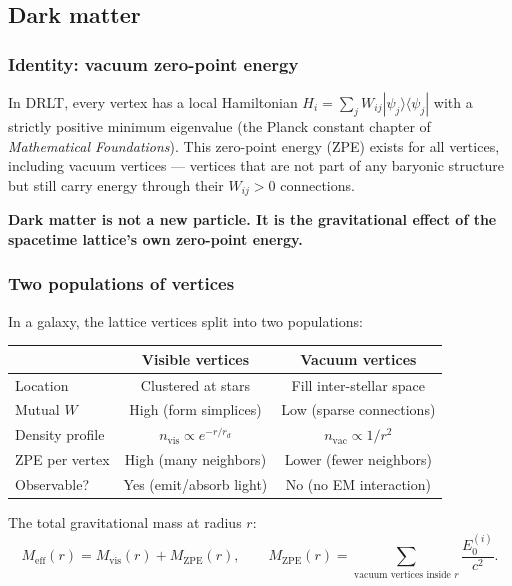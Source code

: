 \documentclass[12pt]{article}
\theoremstyle{remark}
\theoremstyle{definition}
\begin{document}
\subsection{Dark matter}

\subsubsection{Identity: vacuum zero-point energy}

In DRLT, every vertex has a local Hamiltonian $H_i = \sum_j W_{ij}|\psi_j\rangle\langle\psi_j|$ with a strictly positive minimum eigenvalue (the Planck constant chapter of \textit{Mathematical Foundations}). This zero-point energy (ZPE) exists for all vertices, including vacuum vertices --- vertices that are not part of any baryonic structure but still carry energy through their $W_{ij} > 0$ connections.

\textbf{Dark matter is not a new particle. It is the gravitational effect of the spacetime lattice's own zero-point energy.}

\subsubsection{Two populations of vertices}

In a galaxy, the lattice vertices split into two populations:

\begin{center}
\begin{tabular}{lcc}
\hline
& Visible vertices & Vacuum vertices \\
\hline
Location & Clustered at stars & Fill inter-stellar space \\
Mutual $W$ & High (form simplices) & Low (sparse connections) \\
Density profile & $n_\text{vis} \propto e^{-r/r_d}$ & $n_\text{vac} \propto 1/r^2$ \\
ZPE per vertex & High (many neighbors) & Lower (fewer neighbors) \\
Observable? & Yes (emit/absorb light) & No (no EM interaction) \\
\hline
\end{tabular}
\end{center}

The total gravitational mass at radius $r$:
\begin{equation}
M_\text{eff}(r) = M_\text{vis}(r) + M_\text{ZPE}(r), \qquad M_\text{ZPE}(r) = \sum_{\text{vacuum vertices inside } r} \frac{E_0^{(i)}}{c^2}.
\end{equation}
\end{document}

